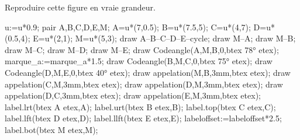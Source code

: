 
\begin{exercice*}
    Reproduire cette figure en vraie grandeur.

    \begin{Geometrie}
        u:=u*0.9;        
        pair A,B,C,D,E,M;
        A=u*(7,0.5);
        B=u*(7.5,5);
        C=u*(4,7);
        D=u*(0.5,4);
        E=u*(2,1);
        M=u*(5,3);
        draw A--B--C--D--E--cycle;
        draw M--A;
        draw M--B;
        draw M--C;
        draw M--D;
        draw M--E;
        draw Codeangle(A,M,B,0,btex \ang{78} etex);
        marque_a:=marque_a*1.5;
        draw Codeangle(B,M,C,0,btex \ang{75} etex);
        draw Codeangle(D,M,E,0,btex \ang{40} etex);
        draw appelation(M,B,3mm,btex  etex);
        draw appelation(C,M,3mm,btex  etex);
        draw appelation(D,M,3mm,btex  etex);
        draw appelation(D,C,3mm,btex  etex);
        draw appelation(E,M,3mm,btex  etex);
        label.lrt(btex A etex,A);
        label.urt(btex B etex,B);
        label.top(btex C etex,C);
        label.lft(btex D etex,D);
        label.llft(btex E etex,E);
        labeloffset:=labeloffset*2.5;
        label.bot(btex M etex,M);
    \end{Geometrie}
\end{exercice*}